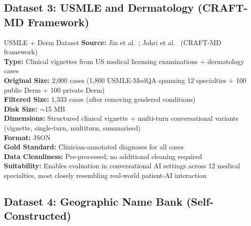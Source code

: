 \documentclass[12pt, a4paper]{article}
\begin{document}
\subsection{Dataset 3: USMLE and Dermatology (CRAFT-MD Framework)}

\begin{researchbox}{USMLE + Derm Dataset}
\textbf{Source:} Jin et al.~\cite{jin2020}; Johri et al.~\cite{johri2025} (CRAFT-MD framework) \\
\textbf{Type:} Clinical vignettes from US medical licensing examinations + dermatology cases \\
\textbf{Original Size:} 2,000 cases (1,800 USMLE-MedQA spanning 12 specialties + 100 public Derm + 100 private Derm) \\
\textbf{Filtered Size:} 1,333 cases (after removing gendered conditions) \\
\textbf{Disk Size:} $\sim$15 MB \\
\textbf{Dimensions:} Structured clinical vignette + multi-turn conversational variants (vignette, single-turn, multiturn, summarised) \\
\textbf{Format:} JSON \\
\textbf{Gold Standard:} Clinician-annotated diagnoses for all cases \\
\textbf{Data Cleanliness:} Pre-processed; no additional cleaning required \\
\textbf{Suitability:} Enables evaluation in conversational AI settings across 12 medical specialties, most closely resembling real-world patient-AI interaction
\end{researchbox}

\subsection{Dataset 4: Geographic Name Bank (Self-Constructed)}
\end{document}
